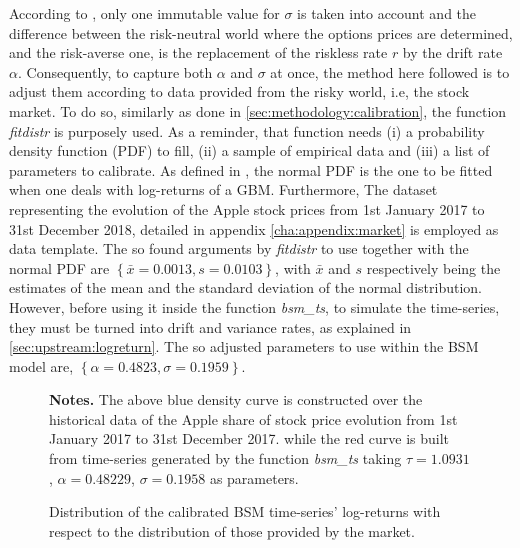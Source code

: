 \documentclass[12pt,a4paper]{report}
\begin{document}
According to \citet{bs}, only one immutable value for $\sigma$ is taken into account and the difference between the risk-neutral world where the options prices are determined, and the risk-averse one, is the replacement of the riskless rate $r$ by the drift rate $\alpha$.
Consequently, to capture both $\alpha$ and $\sigma$ at once, the method here followed is to adjust them according to data provided from the risky world, i.e, the stock market.
To do so, similarly as done in \cref{sec:methodology:calibration}, the function \textit{fitdistr} is purposely used.
As a reminder, that function needs (i) a probability density function (PDF) to fill, (ii) a sample of empirical data and (iii) a list of parameters to calibrate.
As defined in \citet{bs}, the normal  PDF is the one to be fitted when one deals with log-returns of a GBM.
Furthermore, The dataset representing the evolution of the Apple stock prices from 1st January 2017 to 31st December 2018, detailed in appendix \ref{cha:appendix:market} is employed as data template.
The so found arguments by \textit{fitdistr} to use together with the normal PDF are $\left\{ \bar{x} = 0.0013, s = 0.0103 \right\}$, with $\bar{x}$ and $s$ respectively being the estimates of the mean and the standard deviation of the normal distribution.
However, before using it inside the function \textit{bsm\_ts}, to simulate the time-series, they must be turned into drift and variance rates, as explained in \cref{sec:upstream:logreturn}.
The so adjusted parameters to use within the BSM model are, $\left\{ \alpha = 0.4823, \sigma = 0.1959  \right\}$.

\begin{figure}[h]
  \centering
  
  \caption{Distribution of the calibrated BSM time-series' log-returns with respect to the distribution of those provided by the market.}
  \begin{changemargin}{0.5cm}{0.5cm}
  \medskip
\footnotesize
{}\textbf{Notes.} The above blue density curve is constructed over the historical data of the Apple share of stock price evolution from 1st January 2017 to 31st December 2017. while the red curve is built from time-series generated by the function \textit{bsm\_ts} taking $\tau = 1.0931$, $\alpha = 0.48229$, $\sigma = 0.1958$ as parameters.
  \end{changemargin}
  \label{p:analysis:gbm:adjusted}
\end{figure}
\end{document}
